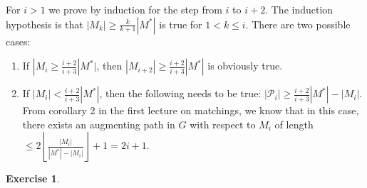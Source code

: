 \documentclass[a4paper,12pt,headsepline]{scrartcl}
\newtheorem{aufgabe}{Exercise}
\begin{document}



For $i>1$ we prove by induction for the step from $i$ to $i+2$.
The induction hypothesis is that $|M_k|\ge \frac{k}{k+1}|M^*|$ is true for $1<k\le i$.
There are two possible cases:
\begin{enumerate}
    \item If $|M_{i}\ge \frac{i+2}{i+3}|M^*|$, then $|M_{i+2}|\ge \frac{i+2}{i+3}|M^*|$ is obviously true.
    \item If $|M_{i}|< \frac{i+2}{i+3}|M^*|$, then the following needs to be true: $|\mathcal P_i|\ge \frac{i+2}{i+3}|M^*|-|M_{i}|$.
        From corollary 2 in the first lecture on matchings, we know that in this case, there exists an augmenting path in $G$ with respect to $M_{i}$ of length $\le 2\left\lfloor\frac{|M_{i}|}{|M^*|-|M_{i}|}\right\rfloor+1=2i+1$.
\end{enumerate}

\newpage
\begin{aufgabe}
\end{aufgabe}
\end{document}
